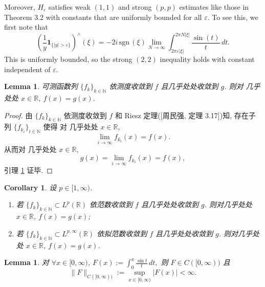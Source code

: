 \documentclass[a4paper,11pt]{article}
\newtheorem{lemma}[theorem]{Lemma}
\newtheorem{corollary}[theorem]{Corollary}
\theoremstyle{definition}
\def \sgn{\mathrm{\,sgn\,}}
\begin{document}
\begin{framed}
    Moreover, $ H_\varepsilon $ satisfies weak $ (1, 1) $ and
    strong $ (p, p) $ estimates like those in Theorem 3.2 with constants that are
    uniformly bounded for all $ \varepsilon $.
    To see this, we first note that 
    $$ 
        \left( \frac{1}{y} \mathbf{1}_{\{|y| > \varepsilon\}} \right)^\wedge (\xi)
            = - 2 i \sgn (\xi) \lim_{N \to \infty} 
                \int_{2 \pi \varepsilon |\xi|}^{2 \pi N |\xi|} \frac{\sin (t)}{t} \, dt.
    $$ 
    This is uniformly bounded,
    so the strong $ (2,2) $ inequality holds with constant independent of $ \varepsilon $.
\end{framed}

\begin{lemma} \label{lem4}
    可测函数列 $ \{f_k\}_{k \in \mathbb{N}} $ 依测度收敛到 $ f $
    且几乎处处收敛到 $ g $. 则对 几乎处处 $ x \in \mathbb{R} $, $ f(x) = g(x) $.
\end{lemma}

\begin{proof}
    由 $ \{f_k\}_{k \in \mathbb{N}} $ 依测度收敛到 $ f $ 和 Riesz 定理([周民强, 定理 3.17])知, 
    存在子列 $ \{f_{k_i}\}_{i \in \mathbb{N}} $ 使得
    对 几乎处处 $ x \in \mathbb{R} $, 
    $$
        \lim_{i \to \infty} f_{k_i} (x) = f(x).
    $$
    从而对 几乎处处 $ x \in \mathbb{R} $, 
    $$
        g(x) = \lim_{i \to \infty} f_{k_i} (x) = f(x),
    $$
    引理 \ref{lem4} 证毕.
\end{proof}

\begin{corollary} \label{corollary}
    设 $ p \in [1, \infty) $. 
    \begin{enumerate}[{\rm(i)}]
        \item 若 $ \{f_k\}_{k \in \mathbb{N}} \subset L^p(\mathbb{R}) $ 依范数收敛到 $ f $ 
        且几乎处处收敛到 $ g $. 则对几乎处处 $ x \in \mathbb{R} $, $ f(x) = g(x) $;
        \item 若 $ \{f_k\}_{k \in \mathbb{N}} \subset L^{p, \infty}(\mathbb{R}) $ 依拟范数收敛到 $ f $ 
        且几乎处处收敛到 $ g $. 则对几乎处处 $ x \in \mathbb{R} $, $ f(x) = g(x) $.
    \end{enumerate}
\end{corollary}

\begin{lemma} \label{lem1}
    对 $ \forall x \in [0, \infty) $, 
    $  F(x) := \int_0^x \frac{\sin t}{t} \, dt, $
    则 $ F \in C([0, \infty)) $ 且 
    $$ 
        \| F \|_{C([0, \infty))} := \sup_{x \in [0, \infty)} |F(x)| < \infty.
    $$
\end{lemma}
\end{document}
